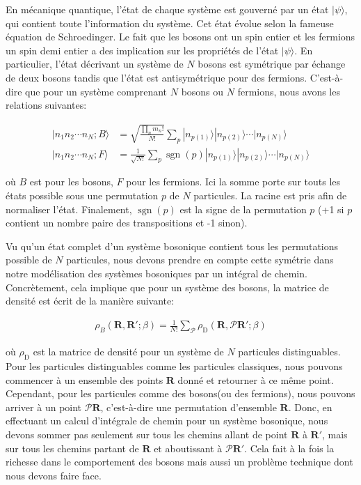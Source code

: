 \documentclass[11pt]{article}
\theoremstyle{definition}
\theoremstyle{remark}
\begin{document}
En mécanique quantique, l'état de chaque système est gouverné par un état $|\psi \rangle$, qui contient toute l'information du système. Cet état évolue selon la fameuse équation de Schroedinger. Le fait que les bosons ont un spin entier et les fermions un spin demi entier a des implication sur les propriétés de l'état $| \psi \rangle$. En particulier, l’état décrivant un système de $N$ bosons est symétrique par échange de deux bosons tandis que l'état est antisymétrique pour des fermions. C'est-à-dire que pour un système comprenant $N$ bosons ou $N$ fermions, nous avons les relations suivantes: 

\begin{align} 
\label{symetrie_boson_fermion}
|n_1 n_2 \cdots n_N; B\rangle &= \sqrt{\frac{\prod_n m_n!}{N!}} \sum_p |n_{p(1)}\rangle |n_{p(2)}\rangle \cdots |n_{p(N)}\rangle \\
|n_1 n_2 \cdots n_N; F\rangle &= \frac{1}{\sqrt{N!}} \sum_p \operatorname{sgn}(p) |n_{p(1)}\rangle |n_{p(2)}\rangle \cdots |n_{p(N)}\rangle
\end{align}

où $B$ est pour les bosons, $F$ pour les fermions. Ici la somme porte sur touts les états possible sous une permutation $p$ de $N$ particules. La racine est pris afin de normaliser l'état. Finalement, $\operatorname{sgn}(p)$ est la signe de la permutation $p$ (+1 si $p$ contient un nombre paire des transpositions et -1 sinon). 

Vu qu'un état complet d'un système bosonique contient tous les permutations possible de $N$ particules, nous devons prendre en compte cette symétrie dans notre modélisation des systèmes bosoniques par un intégral de chemin. Concrètement, cela implique que pour un système des bosons, la matrice de densité est écrit de la manière suivante: 

\begin{align} 
\label{densite_boson}
\rho_{B}( \mathbf{R}, \mathbf{R}'; \beta) = \frac{1}{N!}\sum_{\mathcal{P}} \rho_{\mathrm{D}} (\mathbf{R}, \mathcal{P} \mathbf{R}'; \beta)
\end{align}

où $\rho_{\mathrm{D}}$ est la matrice de densité pour un système de $N$ particules distinguables. Pour les particules distinguables comme les particules classiques, nous pouvons commencer à un ensemble des points $\mathbf{R}$ donné et retourner à ce même point. Cependant, pour les particules comme des bosons(ou des fermions), nous pouvons arriver à un point $\mathcal{P}\mathbf{R}$, c'est-à-dire une permutation d'ensemble $\mathbf{R}$. Donc, en effectuant un calcul d’intégrale de chemin pour un système bosonique, nous devons sommer pas seulement sur tous les chemins allant de point $\mathbf{R}$ à $\mathbf{R}'$, mais sur tous les chemins partant de $\mathbf{R}$ et aboutissant à $\mathcal{P}\mathbf{R}'$. Cela fait à la fois la richesse dans le comportement des bosons mais aussi un problème technique dont nous devons faire face. 
\end{document}
